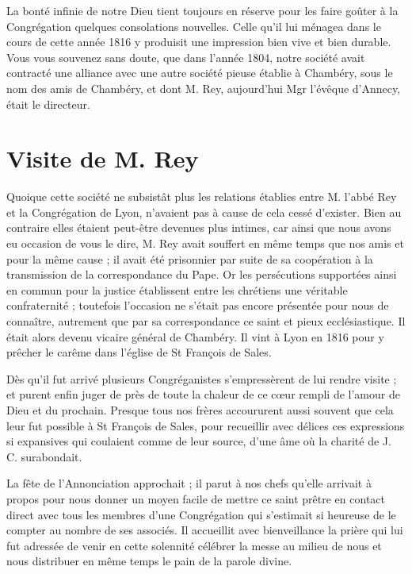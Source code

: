 La bonté infinie de notre Dieu tient toujours en réserve pour les faire goûter à la Congrégation quelques consolations nouvelles. Celle qu'il lui ménagea dans le cours de cette année 1816 y produisit une impression bien vive et bien durable. Vous vous souvenez sans doute, que dans l'année 1804, notre société
avait contracté une alliance avec une autre société pieuse établie à Chambéry, sous le nom des amis de Chambéry, et dont M. Rey, aujourd'hui Mgr l'évêque d'Annecy, était le directeur.

\section*{Visite de M. Rey}
Quoique cette société ne subsistât plus les relations établies entre M. l'abbé Rey et la Congrégation de Lyon, n'avaient pas à cause de cela cessé d'exister. Bien au contraire elles étaient peut-être devenues plus intimes, car ainsi que nous avons eu occasion de vous le dire, M. Rey avait souffert en même temps que nos amis et pour la même cause ; il avait été prisonnier par suite de sa coopération à la transmission de la correspondance du Pape. Or les persécutions supportées ainsi en commun pour la justice établissent entre les chrétiens une véritable confraternité ; toutefois l'occasion ne s'était pas encore présentée pour nous de connaître, autrement que par sa correspondance ce saint et pieux ecclésiastique. Il était alors devenu vicaire général de Chambéry. Il vint à Lyon en 1816 pour y prêcher le carême dans l'église de St François de Sales.

Dès qu'il fut arrivé plusieurs Congréganistes s'empressèrent de lui rendre visite ; et purent enfin juger de près de toute la chaleur de ce cœur rempli de l'amour de Dieu et du prochain. Presque tous nos frères accoururent aussi souvent que cela leur fut possible à St François de Sales, pour recueillir avec délices ces expressions si expansives qui coulaient comme de leur source, d'une âme où la charité de J. C. surabondait.

La fête de l'Annonciation approchait ; il parut à nos chefs qu'elle arrivait à propos pour nous donner un moyen
facile de mettre ce saint prêtre en contact direct avec tous les membres d'une Congrégation qui s'estimait si heureuse de le compter au nombre de ses associés. Il accueillit avec bienveillance la prière qui lui fut adressée de venir en cette solennité célébrer la messe au milieu de nous et nous distribuer en même temps le pain de la parole divine.

